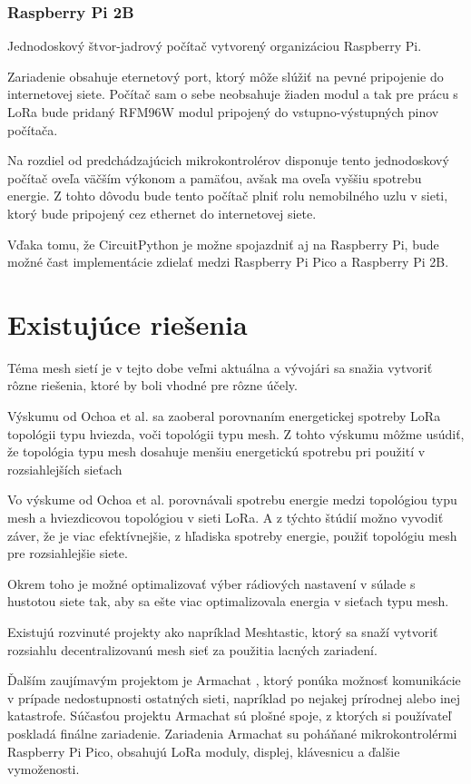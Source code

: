 \documentclass[slovak,master]{diploma}
\begin{document}
\subsection{Raspberry Pi 2B}
Jednodoskový štvor-jadrový počítač vytvorený organizáciou Raspberry Pi.

Zariadenie obsahuje eternetový port, ktorý môže slúžiť na pevné pripojenie do internetovej siete.
Počítač sam o sebe neobsahuje žiaden modul a tak pre prácu s LoRa bude pridaný RFM96W modul pripojený do vstupno-výstupných pinov počítača.

Na rozdiel od predchádzajúcich mikrokontrolérov disponuje tento jednodoskový počítač oveľa väčším výkonom a pamäťou, 
avšak ma oveľa vyššiu spotrebu energie. Z tohto dôvodu bude tento počítač plniť rolu nemobilného uzlu v sieti, ktorý bude pripojený cez ethernet do internetovej siete.

Vďaka tomu, že CircuitPython je možne spojazdniť aj na Raspberry Pi, bude možné čast implementácie zdielať medzi Raspberry Pi Pico a Raspberry Pi 2B.


\chapter{Existujúce riešenia}
Téma mesh sietí je v tejto dobe veľmi aktuálna a vývojári sa snažia vytvoriť rôzne riešenia, ktoré by boli vhodné pre rôzne účely.

Výskumu od Ochoa et al. \cite{8115793} sa zaoberal porovnaním energetickej spotreby LoRa topológii typu hviezda, 
voči topológii typu mesh. Z tohto výskumu môžme usúdiť, že topológia typu mesh dosahuje menšiu energetickú spotrebu pri 
použití v rozsiahlejších sieťach 

Vo výskume od Ochoa et al. \cite{8115793} porovnávali spotrebu energie medzi 
topológiou typu mesh a hviezdicovou topológiou v sieti LoRa. A z týchto štúdií možno vyvodiť záver, že je viac
efektívnejšie, z hľadiska spotreby energie, použiť topológiu mesh pre rozsiahlejšie siete. 

Okrem toho je možné optimalizovať výber rádiových nastavení v súlade s hustotou siete tak, 
aby sa ešte viac optimalizovala energia v sieťach typu mesh.

Existujú rozvinuté projekty ako napríklad Meshtastic, ktorý sa snaží vytvoriť rozsiahlu decentralizovanú mesh sieť 
za použitia lacných zariadení.

Ďalším zaujímavým projektom je Armachat \cite{armachat}, ktorý ponúka možnosť komunikácie v prípade nedostupnosti ostatných sieti, napríklad po nejakej prírodnej alebo inej katastrofe.
Súčasťou projektu Armachat sú plošné spoje, z ktorých si používateľ poskladá finálne zariadenie.
Zariadenia Armachat su poháňané mikrokontrolérmi Raspberry Pi Pico, obsahujú LoRa moduly, displej, klávesnicu a ďalšie vymoženosti.
\end{document}
